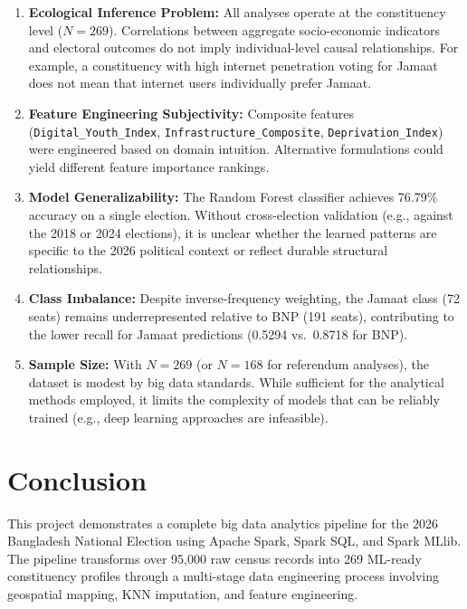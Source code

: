 \documentclass[12pt, a4paper]{article}
\begin{document}
\begin{enumerate}
    \item \textbf{Ecological Inference Problem:} All analyses operate at the constituency level ($N = 269$). Correlations between aggregate socio-economic indicators and electoral outcomes do not imply individual-level causal relationships. For example, a constituency with high internet penetration voting for Jamaat does not mean that internet users individually prefer Jamaat.

    \item \textbf{Feature Engineering Subjectivity:} Composite features (\texttt{Digital\_Youth\_Index}, \texttt{Infrastructure\_Composite}, \texttt{Deprivation\_Index}) were engineered based on domain intuition. Alternative formulations could yield different feature importance rankings.

    \item \textbf{Model Generalizability:} The Random Forest classifier achieves 76.79\% accuracy on a single election. Without cross-election validation (e.g., against the 2018 or 2024 elections), it is unclear whether the learned patterns are specific to the 2026 political context or reflect durable structural relationships.

    \item \textbf{Class Imbalance:} Despite inverse-frequency weighting, the Jamaat class (72 seats) remains underrepresented relative to BNP (191 seats), contributing to the lower recall for Jamaat predictions (0.5294 vs.\ 0.8718 for BNP).

    \item \textbf{Sample Size:} With $N = 269$ (or $N = 168$ for referendum analyses), the dataset is modest by big data standards. While sufficient for the analytical methods employed, it limits the complexity of models that can be reliably trained (e.g., deep learning approaches are infeasible).
\end{enumerate}

\section{Conclusion}

This project demonstrates a complete big data analytics pipeline for the 2026 Bangladesh National Election using Apache Spark, Spark SQL, and Spark MLlib. The pipeline transforms over 95,000 raw census records into 269 ML-ready constituency profiles through a multi-stage data engineering process involving geospatial mapping, KNN imputation, and feature engineering.
\end{document}
